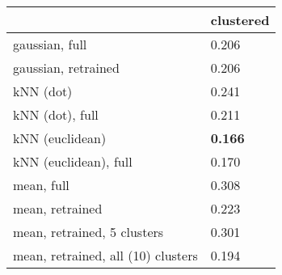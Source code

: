 \begin{tabular}{ll}
\toprule
                                   & clustered\\
\midrule
gaussian, full                     & 0.206\\
gaussian, retrained                & 0.206\\
kNN (dot)                          & 0.241\\
kNN (dot), full                    & 0.211\\
kNN (euclidean)                    & \textbf{0.166}\\
kNN (euclidean), full              & 0.170\\
mean, full                         & 0.308\\
mean, retrained                    & 0.223\\
mean, retrained, 5 clusters        & 0.301\\
mean, retrained, all (10) clusters & 0.194\\
\bottomrule
\end{tabular}
